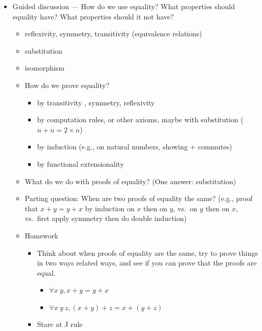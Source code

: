 \documentclass{article}
\begin{document}
\begin{itemize}
  \item
    Guided discussion --- How do we use equality?  What properties should equality have?  What properties should it not have?
    \begin{itemize}
      \item reflexivity, symmetry, transitivity (equivalence relations)
      \item substitution
      \item isomorphism
      \item How do we prove equality?
      \begin{itemize}
        \item by transitivity%
        , symmetry, reflexivity
        \item by computation rules, or other axioms, maybe with substitution ($n + n = 2 \times n$)
        \item by induction (e.g., on natural numbers, showing $+$ commutes)
        \item by functional extensionality
      \end{itemize}
      \item What do we do with proofs of equality?  (One answer: substitution)
      \item Parting question: When are two proofs of equality the same? (e.g., proof that $x + y = y + x$ by induction on $x$ then on $y$, vs.~on $y$ then on $x$, vs.~first apply symmetry then do double induction)
      \item Homework
      \begin{itemize}
        \item Think about when proofs of equality are the same, try to prove things in two ways related ways, and see if you can prove that the proofs are equal.
        \begin{itemize}
          \item $\forall x\ y, x + y = y + x$
          \item $\forall x\ y\ z, (x + y) + z = x + (y + z)$
        \end{itemize}
        \item Stare at J rule \\

\end{itemize}
\end{itemize}
\end{itemize}
\end{document}

